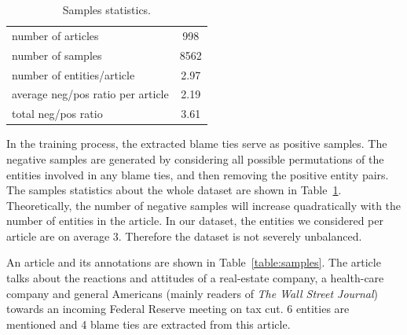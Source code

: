 \documentclass[11pt,a4paper]{article}
\begin{document}
\begin{table}[t!]
\centering
\begin{tabular}{l c} 
 \hline
 number of articles & 998 \\ 
 number of samples & 8562 \\
 number of entities/article & 2.97 \\
 average neg/pos ratio per article & 2.19 \\
 total neg/pos ratio & 3.61 \\
 \hline
\end{tabular}
\caption{Samples statistics.}
\label{table:samplestats}
\end{table}

In the training process, the extracted blame ties serve as positive samples. The negative samples are generated by considering all possible permutations of the entities involved in any blame ties, and then removing the positive entity pairs. The samples statistics about the whole dataset are shown in Table~\ref{table:samplestats}. Theoretically, the number of negative samples will increase quadratically with the number of entities in the article. In our dataset, the entities we considered per article are on average 3. Therefore the dataset is not severely unbalanced.

An article and its annotations are shown in Table~\ref{table:samples}. The article talks about the reactions and attitudes of a real-estate company, a health-care company and general Americans (mainly readers of {\it The Wall Street Journal}) towards an incoming Federal Reserve meeting on tax cut. 6 entities are mentioned and 4 blame ties are extracted from this article.
\end{document}
